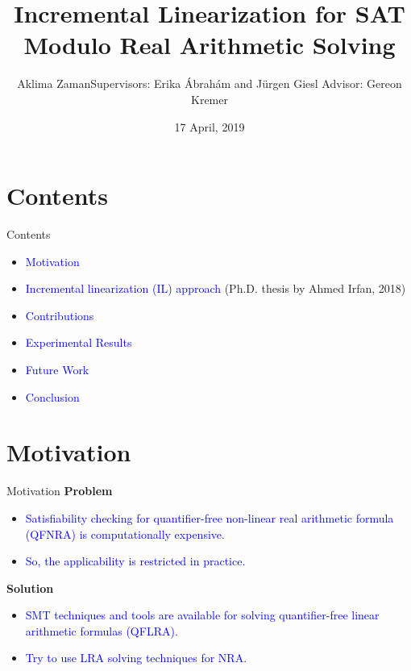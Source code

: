 \documentclass[]{beamer}
\begin{document}
\RWTHtoc

\title[Incremental Linearization for SAT Modulo Real Arithmetic Solving]{Incremental Linearization for SAT Modulo Real Arithmetic Solving}

\author[Aklima Zaman]{\textcolor{RWTHblue}{Aklima Zaman}\linebreak Supervisors: Erika Ábrahám and Jürgen Giesl \linebreak Advisor: Gereon Kremer}

\institute[]{}

\date{17 April, 2019}


\frame{
	\titlepage	
}

\section{Contents}
\begin{frame}{Contents}
    \begin{itemize}
        \item \textcolor<1>{blue}{Motivation}
		\item \textcolor<2>{blue}{Incremental linearization (IL) approach}\newline
		(Ph.D. thesis by Ahmed Irfan, 2018)
		\item \textcolor<3>{blue}{Contributions}
		\item \textcolor<4>{blue}{Experimental Results}
		\item \textcolor<5>{blue}{Future Work}
		\item \textcolor<6>{blue}{Conclusion}
    \end{itemize}
\end{frame}

\section{Motivation}
\begin{frame}{Motivation}
    \textbf{Problem}
    \begin{itemize}
        \item \textcolor<1>{blue}{Satisfiability checking for quantifier-free non-linear real arithmetic formula (QFNRA) is computationally expensive.}
        \item \textcolor<2>{blue}{So, the applicability is restricted in practice.}
    \end{itemize}
    \bigskip
    \bigskip
    \textbf{Solution}
    \begin{itemize}
		\item \textcolor<3>{blue}{SMT techniques and tools are available for solving quantifier-free linear arithmetic formulas (QFLRA).}
		\item \textcolor<4>{blue}{Try to use LRA solving techniques for NRA.}
    \end{itemize}
\end{frame}
\end{document}

